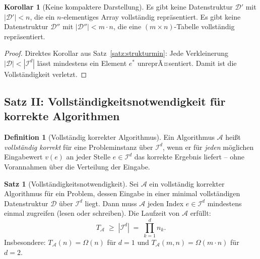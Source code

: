 ﻿\documentclass[a4paper,12pt]{article}
\theoremstyle{definition}
\newtheorem{definition}{Definition}
\newtheorem{satz}{Satz}
\newtheorem{korollar}{Korollar}
\begin{document}
\begin{korollar}[Keine kompaktere Darstellung]
    \label{kor:nochkompakter}
    Es gibt keine Datenstruktur $\mathcal{D}'$ mit $|\mathcal{D}'| < n$,
    die ein $n$-elementiges Array vollst\"{a}ndig repr\"{a}sentiert.
    Es gibt keine Datenstruktur $\mathcal{D}''$ mit $|\mathcal{D}''| < m \cdot n$,
    die eine $(m \times n)$-Tabelle vollst\"{a}ndig repr\"{a}sentiert.
\end{korollar}

\begin{proof}
    Direktes Korollar aus Satz~\ref{satz:strukturmin}: Jede Verkleinerung
    $|\mathcal{D}| < |\mathcal{I}^d|$ l\"{a}sst mindestens ein Element $e^*$
    unreprÃ¤sentiert. Damit ist die Vollst\"{a}ndigkeit verletzt. \qedhere
\end{proof}

\subsection{Satz II: Vollst\"{a}ndigkeitsnotwendigkeit f\"{u}r korrekte Algorithmen}

\begin{definition}[Vollst\"{a}ndig korrekter Algorithmus]
    \label{def:vollalgo}
    Ein Algorithmus $\mathcal{A}$ hei\ss{}t \emph{vollst\"{a}ndig korrekt} f\"{u}r
    eine Probleminstanz \"{u}ber $\mathcal{I}^d$, wenn er f\"{u}r \emph{jeden}
    m\"{o}glichen Eingabewert $v(e)$ an jeder Stelle $e \in \mathcal{I}^d$ das
    korrekte Ergebnis liefert -- ohne Vorannahmen \"{u}ber die Verteilung der Eingabe.
\end{definition}

\begin{satz}[Vollst\"{a}ndigkeitsnotwendigkeit]
    \label{satz:vollnotw}
    Sei $\mathcal{A}$ ein vollst\"{a}ndig korrekter Algorithmus f\"{u}r ein Problem,
    dessen Eingabe in einer minimal vollst\"{a}ndigen Datenstruktur $\mathcal{D}$
    \"{u}ber $\mathcal{I}^d$ liegt. Dann muss $\mathcal{A}$ jeden Index
    $e \in \mathcal{I}^d$ mindestens einmal zugreifen (lesen oder schreiben).
    Die Laufzeit von $\mathcal{A}$ erf\"{u}llt:
    \[
        T_{\mathcal{A}} \;\geq\; |\mathcal{I}^d| \;=\; \prod_{k=1}^d n_k.
    \]
    Insbesondere: $T_{\mathcal{A}}(n) = \Omega(n)$ f\"{u}r $d=1$ und
    $T_{\mathcal{A}}(m,n) = \Omega(m \cdot n)$ f\"{u}r $d=2$.
\end{satz}
\end{document}

